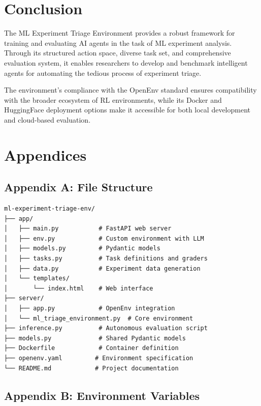 \documentclass[12pt,a4paper]{article}
\begin{document}
\section{Conclusion}

The ML Experiment Triage Environment provides a robust framework for training and evaluating AI agents in the task of ML experiment analysis. Through its structured action space, diverse task set, and comprehensive evaluation system, it enables researchers to develop and benchmark intelligent agents for automating the tedious process of experiment triage.

The environment's compliance with the OpenEnv standard ensures compatibility with the broader ecosystem of RL environments, while its Docker and HuggingFace deployment options make it accessible for both local development and cloud-based evaluation.

\newpage

\section*{Appendices}

\subsection{Appendix A: File Structure}

\begin{verbatim}
ml-experiment-triage-env/
├── app/
│   ├── main.py           # FastAPI web server
│   ├── env.py            # Custom environment with LLM
│   ├── models.py         # Pydantic models
│   ├── tasks.py          # Task definitions and graders
│   ├── data.py           # Experiment data generation
│   └── templates/
│       └── index.html    # Web interface
├── server/
│   ├── app.py            # OpenEnv integration
│   └── ml_triage_environment.py  # Core environment
├── inference.py          # Autonomous evaluation script
├── models.py             # Shared Pydantic models
├── Dockerfile            # Container definition
├── openenv.yaml         # Environment specification
└── README.md            # Project documentation
\end{verbatim}

\subsection{Appendix B: Environment Variables}
\end{document}

